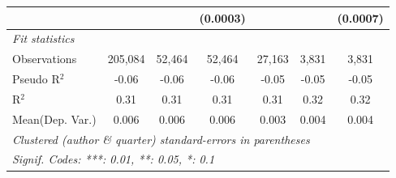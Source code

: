\begin{tabular}{lcccccc}
                                  &                 &                & (0.0003)       &                 &                & (0.0007)\\   
   \midrule
   \emph{Fit statistics}\\
   Observations                   & 205,084         & 52,464         & 52,464         & 27,163          & 3,831          & 3,831\\  
   Pseudo R$^2$                   & -0.06           & -0.06          & -0.06          & -0.05           & -0.05          & -0.05\\  
   R$^2$                          & 0.31            & 0.31           & 0.31           & 0.31            & 0.32           & 0.32\\  
Mean(Dep. Var.) & 0.006 & 0.006 & 0.006 & 0.003 & 0.004 & 0.004 \\
   \midrule \midrule
   \multicolumn{7}{l}{\emph{Clustered (author \& quarter) standard-errors in parentheses}}\\
   \multicolumn{7}{l}{\emph{Signif. Codes: ***: 0.01, **: 0.05, *: 0.1}}\\
\end{tabular}
\par\endgroup
